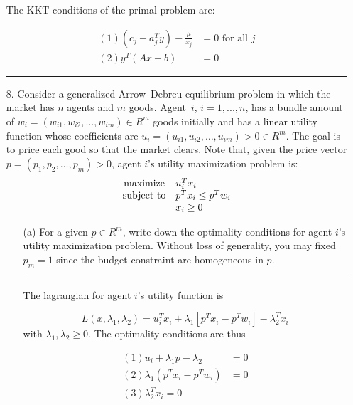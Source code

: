 \documentclass{article} %
\begin{document}
\begin{enumerate}
The KKT conditions of the primal problem are:

\begin{equation*}
\begin{aligned}
(1) (c_j - a_j^T y) - \frac{\mu}{x_j} &= 0 \mbox{ for all } j \\ 
(2) y^T(Ax - b) &= 0 
\end{aligned}
\end{equation*}


 
\rule{\textwidth}{1pt}





\item[8.] Consider a generalized Arrow--Debreu equilibrium problem in which the market has $n$ agents and $m$ goods. Agent~$i$, $i=1,...,n$, has a bundle amount of $w_i=(w_{i1},w_{i2},\ldots,w_{im})\in R^m$ goods initially and has a linear utility function whose coefficients are $u_i=(u_{i1},u_{i2},\ldots,u_{im})>0\in R^m$.  The goal is to price each good so that the market clears. Note that, given the price vector $p=(p_1,p_2,\ldots,p_m) > 0$, agent $i$'s utility maximization problem is:
$$
\begin{array}{c@{\quad}l}
   \mbox{maximize} & u_i^Tx_i \\
   \mbox{subject to} & p^Tx_i\le p^Tw_i\\
   & x_i\ge 0
\end{array}
$$
\begin{itemize}
\item[(a)] For a given $p\in R^m$, write down the optimality conditions for agent $i$'s utility maximization problem. Without loss of generality, you may fixed $p_m=1$ since
the budget constraint are homogeneous in $p$.

\rule{\textwidth}{1pt}


The lagrangian for agent $i$'s utility function is 

\[
L(x, \lambda_1, \lambda_2) = u_i^T x_i + \lambda_1[p^Tx_i - p^T w_i] - \lambda_2^T x_i
\]
with $\lambda_1, \lambda_2 \geq 0$. The optimality conditions are thus

\begin{equation*}
\begin{aligned}
(1) u_i + \lambda_1 p - \lambda_2 &= 0 \\
(2) \lambda_1(p^T x_i - p^T w_i) &= 0 \\ 
(3) \lambda_2^T x_i = 0
\end{aligned}
\end{equation*}


\end{itemize}
\end{enumerate}
\end{document}
